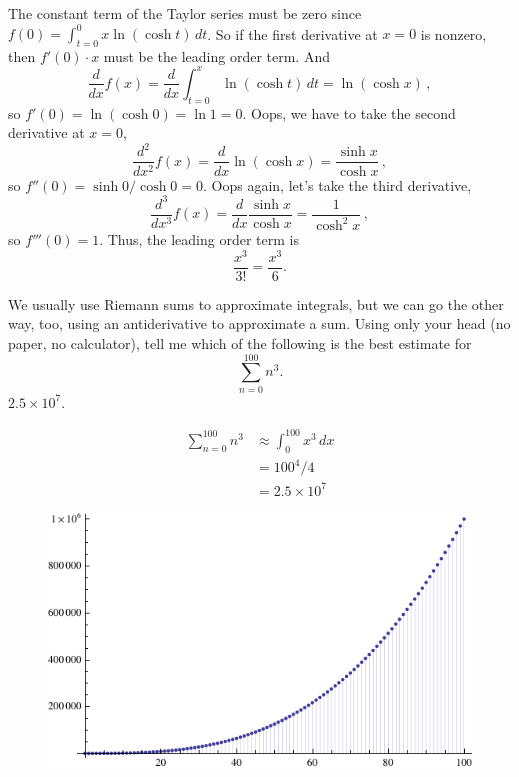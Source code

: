     \parasp
    The constant term of the Taylor series must be zero since $\textstyle f(0) =
    \int_{t=0}^0 x\ln(\cosh t) \, dt $. So if the first derivative at $ x=0 $ is
    nonzero, then $ f'(0)\cdot x $ must be the leading order term. And
        \[ \frac{d}{dx} f(x) = \frac{d}{dx} \int_{t=0}^x\ln(\cosh t) \, dt
                             = \ln(\cosh x)\,, \]
    so $ f'(0) = \ln(\cosh 0) = \ln 1 = 0 $. Oops, we have to take the second
    derivative at $ x=0 $,
        \[ \frac{d^2}{dx^2} f(x) = \frac{d}{dx} \ln(\cosh x)
                                 = \frac{\sinh x}{\cosh x}\,, \]
    so $ f''(0) = \sinh 0 / \cosh 0 = 0 $. Oops again, let's take the third derivative,
        \[ \frac{d^3}{dx^3} f(x) = \frac{d}{dx} \frac{\sinh x}{\cosh x}
                                 = \frac{1}{\cosh^2 x}\,, \]
    so $ f'''(0) = 1 $. Thus, the leading order term is
        \[ \frac{x^3}{3!} = \frac{x^3}6. \]
    
    {We usually use Riemann sums to approximate integrals, but we can go the
    other way, too, using an antiderivative to approximate a sum. Using only
    your head (no paper, no calculator), tell me which of the following is the
    best estimate for
        \[ \sum_{n=0}^{100} n^3. \]}
    {$ 2.5\times 10^7 $.}
    
    \begin{align*}
        \sum_{n=0}^{100} n^3
            &\approx \int_0^{100} x^3 \, dx \\
            &= 100^4/4 \\
            &= 2.5\times 10^7
    \end{align*}
    
    \begin{figure}[h]
    \centering
    \includegraphics[width=0.7\linewidth]{hw26_challenge_fig1}
    \label{fig:hw26_challenge_fig1}
    \end{figure}

